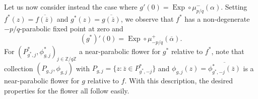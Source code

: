 \documentclass[12pt,letterpaper]{amsart}
\numberwithin{equation}{section}
\newtheorem{theorem}[equation]{Theorem}
\theoremstyle{remark}
\theoremstyle{definition}
\newcommand{\Z}{\mathbb Z}
\DeclareMathOperator{\Exp}{Exp}
\begin{document}
 	Let us now consider instead the case where $g'(0) = \Exp\circ \mu_{p/q}^-(\alpha)$. 
 	Setting $f^*(z) = \overline{f(\overline{z})}$ and $g^*(z) = \overline{g(\overline{z})}$, we observe that $f^*$ has a non-degenerate $-p/q$-parabolic fixed point at zero and $$(g^*)'(0)= \Exp\circ \mu_{-p/q}^+(\overline{\alpha}).$$ For $(P^*_{g^*, j}, \phi^*_{g, j})_{j\in \Z/q\Z}$ a near-parabolic flower for $g^*$ relative to $f^*$, note that collection $(P_{g, j}, \phi_{g, j})$ with $P_{g, j} = \{z: \overline{z}\in P_{g^*, -j}^*\}$  and $\phi_{g, j}(z) = \overline{\phi_{g^*, -j}^*(\overline{z})}$ is a near-parabolic flower for $g$ relative to $f$. With this description, the desired properties for the flower all follow easily.
 	
 	
 	
 	
 	
 	
% 	
%	
\end{document}
